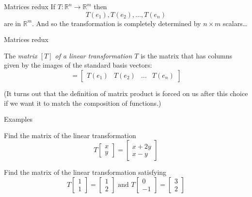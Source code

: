 \documentclass{beamer}
\begin{document}
\begin{frame}{Matrices redux}
If $T:\mathbb{R}^n \rightarrow \mathbb{R}^m$ then
\begin{equation*}
T(e_1), T(e_2),\dots, T(e_n)
\end{equation*}
are in $\mathbb{R}^m$. And so the transformation is completely determined by $n\times m$ scalars\dots
\end{frame}

\begin{frame}{Matrices redux}
\begin{definition}
The \emph{matrix $[T]$ of a linear transformation $T$} is the matrix that has columns given by the images of the standard basis vectors:
\begin{equation*}
[T] = \left[
\begin{array}{cccc}
T(e_1) & T(e_2) &\dots & T(e_n)
\end{array}
\right]
\end{equation*} 
\end{definition}\vfill
(It turns out that the definition of matrix product is forced on us after this choice if we want it to match the composition of functions.)
\end{frame}

\begin{frame}{Examples}
\begin{example}
Find the matrix of the linear transformation
\begin{equation*}
T \left[
\begin{array}{c}
x\\
y
\end{array}
\right] = \left[
\begin{array}{c}
x+2y\\
x-y
\end{array}
\right]
\end{equation*}
\end{example}
\begin{example}
Find the matrix of the linear transformation satisfying
\begin{equation*}
T \left[
\begin{array}{c}
1\\
1
\end{array}
\right] = \left[
\begin{array}{c}
1\\
2
\end{array}
\right]\text{ and } T \left[
\begin{array}{c}
0\\
-1
\end{array}
\right] = \left[
\begin{array}{c}
3\\
2
\end{array}
\right]
\end{equation*}
\end{example}
\end{frame}
\end{document}
